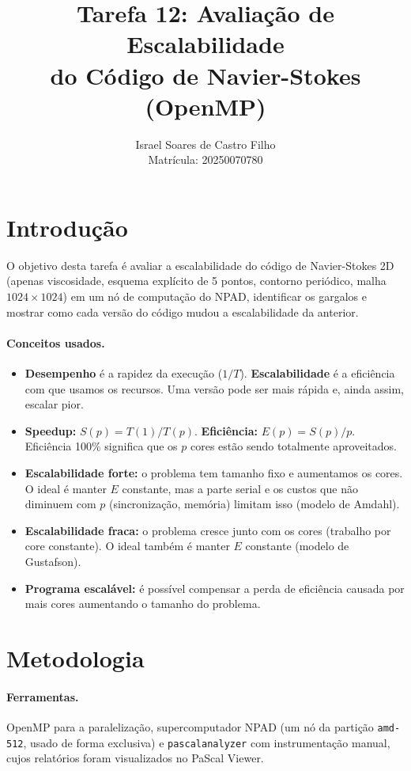 \documentclass[a4paper,12pt]{article}
\title{Tarefa 12: Avaliação de Escalabilidade\\do Código de Navier-Stokes (OpenMP)}
\author{Israel Soares de Castro Filho \\ Matrícula: 20250070780}
\date{}
\begin{document}
\maketitle

\section{Introdução}

O objetivo desta tarefa é avaliar a escalabilidade do código de Navier-Stokes 2D
(apenas viscosidade, esquema explícito de 5 pontos, contorno periódico, malha
$1024 \times 1024$) em um nó de computação do NPAD, identificar os gargalos e
mostrar como cada versão do código mudou a escalabilidade da anterior.

\paragraph{Conceitos usados.}
\begin{itemize}
    \item \textbf{Desempenho} é a rapidez da execução ($1/T$).
          \textbf{Escalabilidade} é a eficiência com que usamos os recursos.
          Uma versão pode ser mais rápida e, ainda assim, escalar pior.
    \item \textbf{Speedup:} $S(p) = T(1)/T(p)$.
          \textbf{Eficiência:} $E(p) = S(p)/p$. Eficiência 100\% significa que
          os $p$ cores estão sendo totalmente aproveitados.
    \item \textbf{Escalabilidade forte:} o problema tem tamanho fixo e
          aumentamos os cores. O ideal é manter $E$ constante, mas a parte
          serial e os custos que não diminuem com $p$ (sincronização, memória)
          limitam isso (modelo de Amdahl).
    \item \textbf{Escalabilidade fraca:} o problema cresce junto com os cores
          (trabalho por core constante). O ideal também é manter $E$ constante
          (modelo de Gustafson).
    \item \textbf{Programa escalável:} é possível compensar a perda de
          eficiência causada por mais cores aumentando o tamanho do problema.
\end{itemize}

\section{Metodologia}

\paragraph{Ferramentas.} OpenMP para a paralelização, supercomputador NPAD
(um nó da partição \texttt{amd-512}, usado de forma exclusiva) e
\texttt{pascalanalyzer} com instrumentação manual, cujos relatórios foram
visualizados no PaScal Viewer.
\end{document}
